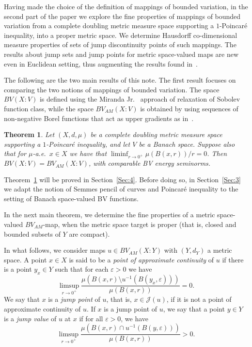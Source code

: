 \documentclass[11pt, letterpaper]{amsart} %
\newcommand*{\eps}{\varepsilon}
\numberwithin{equation}{section}
\theoremstyle{plain}
\newtheorem{theorem}[equation]{Theorem}
\theoremstyle{definition}
\begin{document}
{Having made the choice of the definition of mappings of bounded variation, in the second part of the paper we 
explore the fine properties of mappings of bounded variation from a complete doubling metric measure space 
supporting a $1$-Poincar\'e inequality, into a proper metric space. We determine Hausdorff co-dimensional measure
properties of sets of jump discontinuity points of such mappings. The results about jump sets
and jump points for metric space-valued maps
are new even in Euclidean setting, thus augmenting the results found in~\cite{Ambrosio1990,
Ambrosio1990-II}.



The following are the two main results of this note. The first result focuses on comparing the two notions of 
mappings of bounded variation. The space $BV(X:V)$ is defined using the Miranda Jr.~\cite{Miranda} approach of relaxation
of Sobolev function class, while the space $BV_{AM}(X:V)$ is obtained by using sequences of non-negative Borel
functions that act as upper gradients as in~\cite{Martio}.

\begin{theorem}\label{thm:main}
Let $(X,d,\mu )$ be a complete doubling metric measure space supporting a $1$-Poincaré inequality, and
let $V$ be a Banach space. Suppose also that for $\mu$-a.e.~$x\in X$ we have that $\liminf_{r\to 0^+}\mu(B(x,r))/r=0$.
Then $BV(X:V)=BV_{AM}(X:V)$, with comparable BV energy seminorms.
\end{theorem}

Theorem~\ref{thm:main} will be proved in Section~\ref{Sec:4}. Before doing so, in Section~\ref{Sec:3} we adapt the notion
of Semmes pencil of curves and Poincar\'e inequality to the setting of Banach space-valued BV functions.

In the next main theorem, we determine the fine properties of a metric space-valued $BV_{AM}$-map, when the metric
space target is proper (that is, closed and bounded subsets of $Y$ are compact).

In what follows, we consider maps $u\in BV_{AM}(X:Y)$ with $(Y,d_Y)$ a metric space. A point $x\in X$
is said to be a \emph{point of approximate continuity} of $u$ if there is a point $y_x\in Y$ such that
for each $\eps>0$ we have
\[
\limsup_{r\to 0^+}\frac{\mu(B(x,r)\setminus u^{-1}(B(y_x,\eps)))}{\mu(B(x,r))}=0.
\]
We say that $x$ is a \emph{jump point} of $u$, that is, $x\in \mathcal{J}(u)$, if it is not a point of approximate continuity of $u$. 
If $x$ is a jump point of $u$, we say that a point $y\in Y$ is a \emph{jump value} of $u$ at $x$ if for all $\eps>0$,
we have
\[
\limsup_{r\to 0^+}\frac{\mu(B(x,r)\cap u^{-1}(B(y,\eps)))}{\mu(B(x,r))}>0.
\]

}
\end{document}

